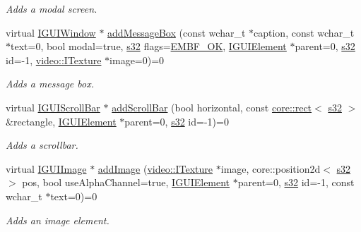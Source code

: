 \begin{DoxyCompactItemize}
\begin{DoxyCompactList}\small\item\em Adds a modal screen. \end{DoxyCompactList}\item 
virtual \hyperlink{classirr_1_1gui_1_1IGUIWindow}{I\+G\+U\+I\+Window} $\ast$ \hyperlink{classirr_1_1gui_1_1IGUIEnvironment_aaf8cad4624c26895523b22728098a917}{add\+Message\+Box} (const wchar\+\_\+t $\ast$caption, const wchar\+\_\+t $\ast$text=0, bool modal=true, \hyperlink{namespaceirr_ac66849b7a6ed16e30ebede579f9b47c6}{s32} flags=\hyperlink{namespaceirr_1_1gui_af55112e55731c9ad1b9fe9b372c521afaa3ffecf59885ff91a925aa3e27269db9}{E\+M\+B\+F\+\_\+\+OK}, \hyperlink{classirr_1_1gui_1_1IGUIElement}{I\+G\+U\+I\+Element} $\ast$parent=0, \hyperlink{namespaceirr_ac66849b7a6ed16e30ebede579f9b47c6}{s32} id=-\/1, \hyperlink{classirr_1_1video_1_1ITexture}{video\+::\+I\+Texture} $\ast$image=0)=0
\begin{DoxyCompactList}\small\item\em Adds a message box. \end{DoxyCompactList}\item 
virtual \hyperlink{classirr_1_1gui_1_1IGUIScrollBar}{I\+G\+U\+I\+Scroll\+Bar} $\ast$ \hyperlink{classirr_1_1gui_1_1IGUIEnvironment_aff82c4b3935eaf56ce638996f5e002c9}{add\+Scroll\+Bar} (bool horizontal, const \hyperlink{classirr_1_1core_1_1rect}{core\+::rect}$<$ \hyperlink{namespaceirr_ac66849b7a6ed16e30ebede579f9b47c6}{s32} $>$ \&rectangle, \hyperlink{classirr_1_1gui_1_1IGUIElement}{I\+G\+U\+I\+Element} $\ast$parent=0, \hyperlink{namespaceirr_ac66849b7a6ed16e30ebede579f9b47c6}{s32} id=-\/1)=0
\begin{DoxyCompactList}\small\item\em Adds a scrollbar. \end{DoxyCompactList}\item 
virtual \hyperlink{classirr_1_1gui_1_1IGUIImage}{I\+G\+U\+I\+Image} $\ast$ \hyperlink{classirr_1_1gui_1_1IGUIEnvironment_a35cc257b3a183551a2ed0376dcec9fe4}{add\+Image} (\hyperlink{classirr_1_1video_1_1ITexture}{video\+::\+I\+Texture} $\ast$image, core\+::position2d$<$ \hyperlink{namespaceirr_ac66849b7a6ed16e30ebede579f9b47c6}{s32} $>$ pos, bool use\+Alpha\+Channel=true, \hyperlink{classirr_1_1gui_1_1IGUIElement}{I\+G\+U\+I\+Element} $\ast$parent=0, \hyperlink{namespaceirr_ac66849b7a6ed16e30ebede579f9b47c6}{s32} id=-\/1, const wchar\+\_\+t $\ast$text=0)=0
\begin{DoxyCompactList}\small\item\em Adds an image element. \end{DoxyCompactList}\item 

\end{DoxyCompactItemize}
